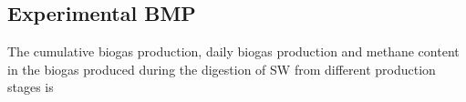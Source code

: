 \subsection{Experimental BMP}
The cumulative biogas production, daily biogas production and methane content in the biogas produced during the digestion of SW from different production stages is